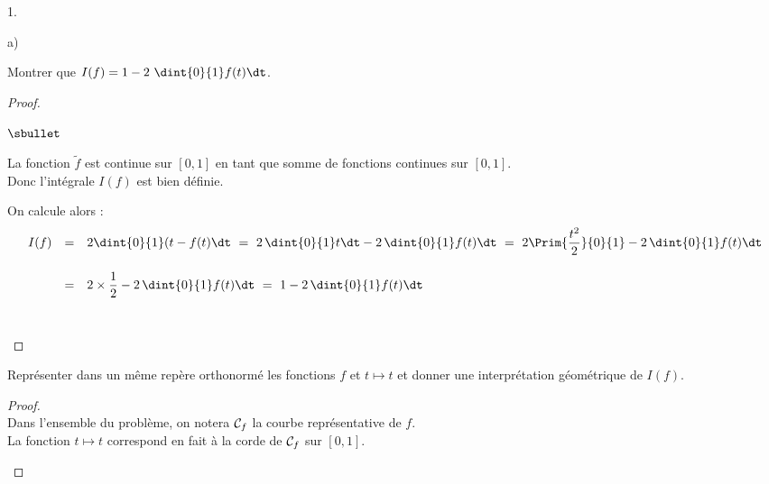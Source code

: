 \documentclass[11pt]{article}%
\begin{document}
\begin{noliste}{1.}
\begin{noliste}{a)}
  \item Montrer que $I(f)= 1-2 \ \dint{0}{1}f(t) \dt$. 
  
  \begin{proof}~
    \begin{noliste}{$\sbullet$}
      \item La fonction $\tilde{f}$ est continue sur $[0,1]$ en tant 
      que somme de fonctions continues sur $[0,1]$.\\
      Donc l'intégrale $I(f)$ est bien définie.
      
      \item On calcule alors :
      \[
      \begin{array}{rcl}
        I(f) &=& 2 \dint{0}{1}(t-f(t) \dt \ = \ 
        2 \, \dint{0}{1} t \dt - 2 \, \dint{0}{1} f(t) \dt
        \ = \ 2\Prim{\dfrac{t^2}{2}}{0}{1} - 2 \, \dint{0}{1} f(t) \dt
        \\[.6cm]
        &=& 2 \times \dfrac{1}{2} - 2 \, \dint{0}{1} f(t) \dt
        \ = \ 1- 2 \, \dint{0}{1} f(t) \dt
      \end{array}
      \]
      ~\\[-1.2cm]
    \end{noliste}
  \end{proof}

  
  \item Représenter dans un même repère orthonormé les fonctions $f$ et 
  $t \mapsto t $ et donner une interprétation géométrique de $I(f)$.
  
  \begin{proof}~\\
    Dans l'ensemble du problème, on notera ${\cal C}_f$ la courbe
    représentative de $f$.\\
    La fonction $t\mapsto t$ correspond en fait à la corde de 
    ${\cal C}_f$ sur $[0,1]$. 
    
    \begin{center}
    \shorthandoff{;} 
\end{center}
\end{proof}
\end{noliste}
\end{noliste}
\end{document}
